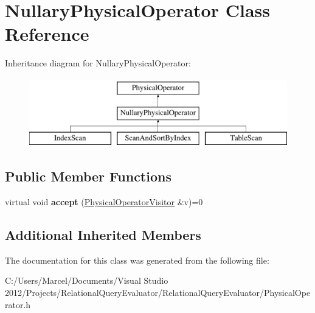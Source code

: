 \hypertarget{class_nullary_physical_operator}{\section{Nullary\+Physical\+Operator Class Reference}
\label{class_nullary_physical_operator}
}
Inheritance diagram for Nullary\+Physical\+Operator\+:\begin{figure}[H]
\begin{center}
\leavevmode
\includegraphics[height=3.000000cm]{class_nullary_physical_operator}
\end{center}
\end{figure}
\subsection*{Public Member Functions}
\begin{DoxyCompactItemize}
\item 
\hypertarget{class_nullary_physical_operator_a053a51bc73b06d883fba982adeeb122c}{virtual void {\bfseries accept} (\hyperlink{class_physical_operator_visitor}{Physical\+Operator\+Visitor} \&v)=0}\label{class_nullary_physical_operator_a053a51bc73b06d883fba982adeeb122c}

\end{DoxyCompactItemize}
\subsection*{Additional Inherited Members}


The documentation for this class was generated from the following file\+:\begin{DoxyCompactItemize}
\item 
C\+:/\+Users/\+Marcel/\+Documents/\+Visual Studio 2012/\+Projects/\+Relational\+Query\+Evaluator/\+Relational\+Query\+Evaluator/Physical\+Operator.\+h\end{DoxyCompactItemize}
